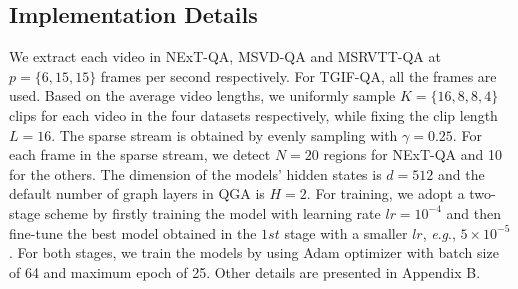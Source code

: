 \documentclass[letterpaper]{article} \usepackage{aaai21}  \usepackage{times}  \usepackage{helvet} \usepackage{courier}  \usepackage[hyphens]{url}  \usepackage{graphicx} \urlstyle{rm} \def\UrlFont{\rm}  \usepackage{natbib}  \usepackage{caption} \usepackage{color, colortbl}
\newcommand{\eg}{\textit{e}.\textit{g}.}
\begin{document}
\setlength{\belowcaptionskip}{-0.2cm}
\begin{table*}[t!]
\small
\centering
\begin{threeparttable}
\caption{Comparison of accuracy. The best and second-best results are highlighted in bold and underline respectively.}
\label{table:next_result}
\end{threeparttable}
\vspace{-1.0em}
\end{table*}

\subsection{Implementation Details}
We extract each video in NExT-QA, MSVD-QA and MSRVTT-QA at $p=\{6, 15, 15\}$ frames per second respectively. For TGIF-QA, all the frames are used. Based on the average video lengths, we uniformly sample $K=\{16, 8, 8, 4\}$ clips for each video in the four datasets respectively, while fixing the clip length $L=16$. The sparse stream is obtained by evenly sampling with $\gamma=0.25$. For each frame in the sparse stream, we detect $N=20$ regions for NExT-QA and 10 for the others. The dimension of the models' hidden states is $d=512$ and the default number of graph layers in QGA is $H=2$. For training, we adopt a two-stage scheme by firstly training the model with learning rate $lr=10^{-4}$ and then fine-tune the best model obtained in the $1st$ stage with a smaller $lr$, \eg, $5\times10^{-5}$. For both stages, we train the models by using Adam optimizer with batch size of 64 and maximum epoch of 25. Other details are presented in Appendix B.
\end{document}
